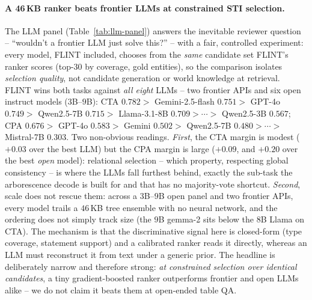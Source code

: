 \paragraph{A 46\,KB ranker beats frontier LLMs at constrained STI selection.}
The LLM panel (Table~\ref{tab:llm-panel}) answers the inevitable reviewer question --
``wouldn't a frontier LLM just solve this?'' -- with a fair, controlled experiment:
every model, FLINT included, chooses from the \emph{same} candidate set FLINT's ranker
scores (top-$30$ by coverage, gold entities), so the comparison isolates
\emph{selection quality}, not candidate generation or world knowledge at retrieval.
FLINT wins both tasks against \emph{all eight} LLMs -- two frontier APIs and six open
instruct models ($3$B--$9$B): CTA $0.782 >$ Gemini-2.5-flash $0.751 >$ GPT-4o $0.749 >$
Qwen2.5-7B $0.715 >$ Llama-3.1-8B $0.709 > \cdots >$ Qwen2.5-3B $0.567$; CPA $0.676 >$
GPT-4o $0.583 >$ Gemini $0.502 >$ Qwen2.5-7B $0.480 > \cdots >$ Mistral-7B $0.303$. Two
non-obvious readings. \emph{First}, the CTA margin is modest ($+0.03$ over the best
LLM) but the CPA margin is large ($+0.09$, and $+0.20$ over the best \emph{open}
model): relational selection -- which property, respecting global consistency -- is
where the LLMs fall furthest behind, exactly the sub-task the arborescence decode is
built for and that has no majority-vote shortcut. \emph{Second}, scale does not rescue
them: across a $3$B--$9$B open panel and two frontier APIs, every model trails a
$46$\,KB tree ensemble with no neural network, and the ordering does not simply track
size (the $9$B gemma-2 sits below the $8$B Llama on CTA). The mechanism is that
the discriminative signal here is closed-form (type coverage, statement support) and a
calibrated ranker reads it directly, whereas an LLM must reconstruct it from text under
a generic prior. The headline is deliberately narrow and therefore strong: \emph{at
constrained selection over identical candidates}, a tiny gradient-boosted ranker
outperforms frontier and open LLMs alike -- we do not claim it beats them at open-ended
table QA.


